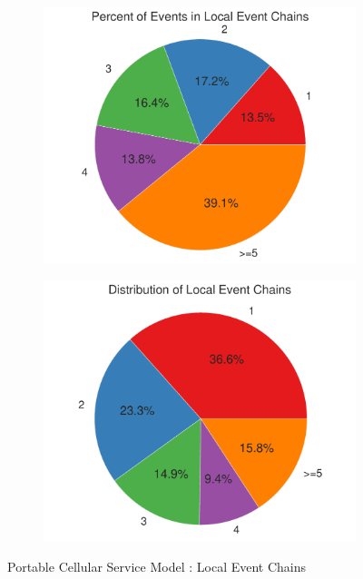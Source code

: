 \documentclass[11pt]{book}
\begin{document}
\begin{figure}
    \centering
    \begin{subfigure}{.48\textwidth}
        \centering
        \includegraphics[width=1\textwidth]{figures/local_event_chain/pcs_total.pdf}
    \end{subfigure}
    \begin{subfigure}{.48\textwidth}
        \centering
        \includegraphics[width=1\textwidth]{figures/local_event_chain/pcs_summary.pdf}
    \end{subfigure}
    \caption{Portable Cellular Service Model : Local Event Chains}
    \label{fig:local_event_chain:pcs}
\end{figure}
\end{document}
